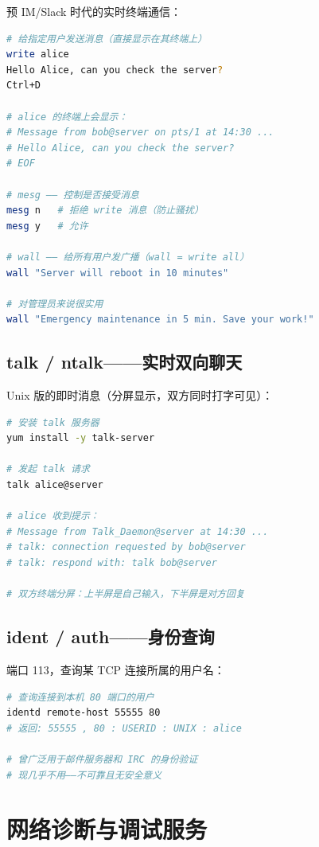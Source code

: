 \documentclass[12pt,UTF8]{ctexbook}
\begin{document}
预 IM/Slack 时代的实时终端通信：

\begin{lstlisting}[language=bash]
# 给指定用户发送消息（直接显示在其终端上）
write alice
Hello Alice, can you check the server?
Ctrl+D

# alice 的终端上会显示：
# Message from bob@server on pts/1 at 14:30 ...
# Hello Alice, can you check the server?
# EOF

# mesg —— 控制是否接受消息
mesg n   # 拒绝 write 消息（防止骚扰）
mesg y   # 允许

# wall —— 给所有用户发广播（wall = write all）
wall "Server will reboot in 10 minutes"

# 对管理员来说很实用
wall "Emergency maintenance in 5 min. Save your work!"
\end{lstlisting}

\subsection{talk / ntalk——实时双向聊天}

Unix 版的即时消息（分屏显示，双方同时打字可见）：

\begin{lstlisting}[language=bash]
# 安装 talk 服务器
yum install -y talk-server

# 发起 talk 请求
talk alice@server

# alice 收到提示：
# Message from Talk_Daemon@server at 14:30 ...
# talk: connection requested by bob@server
# talk: respond with: talk bob@server

# 双方终端分屏：上半屏是自己输入，下半屏是对方回复
\end{lstlisting}

\subsection{ident / auth——身份查询}

端口 113，查询某 TCP 连接所属的用户名：

\begin{lstlisting}[language=bash]
# 查询连接到本机 80 端口的用户
identd remote-host 55555 80
# 返回: 55555 , 80 : USERID : UNIX : alice

# 曾广泛用于邮件服务器和 IRC 的身份验证
# 现几乎不用——不可靠且无安全意义
\end{lstlisting}

\section{网络诊断与调试服务}
\label{sec:debug-services}
\end{document}
